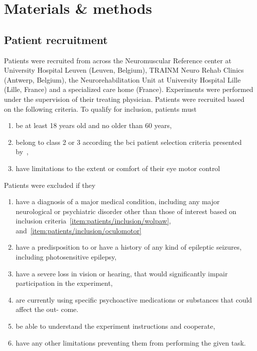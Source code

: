 \section{Materials \& methods}
\subsection{Patient recruitment}
Patients were recruited from across the Neuromuscular Reference center at
University Hospital Leuven (Leuven, Belgium), TRAINM Neuro Rehab Clinics
(Antwerp, Belgium), the Neurorehabilitation Unit at University Hospital Lille
(Lille, France) and a specialized care home (France).
Experiments were performed under the supervision of their treating physician.
Patients were recruited based on the following criteria.
To qualify for inclusion, patients must
\begin{enumerate}
	\item be at least 18 years old and no older than 60
	years,
  \item belong to class 2 or 3 according the \ac{bci}	patient selection criteria
    presented by~\textcite{Wolpaw2006},\label{item:patients/inclusion/wolpaw}
  \item have limitations to the extent or comfort of their eye motor control\label{item:patients/inclusion/oculomotor}
\end{enumerate}
Patients were excluded if they
\begin{enumerate}
  \item have a diagnosis of a major medical condition, including any major
    neurological or psychiatric disorder other than those of interest based on
    inclusion criteria~\ref{item:patients/inclusion/wolpaw},
    and~\ref{item:patients/inclusion/oculomotor}\label{item:patients/exclusion/medical}
  \item have a predisposition to or have a history of any kind of epileptic seizures,
    including photosensitive epilepsy,\label{item:patients/exclusion/epilepsy}
  \item have a severe loss in vision or hearing, that would significantly impair
        participation in the experiment,\label{item:patients/exclusion/vision}
  \item are currently using specific psychoactive medications or substances that could affect the out-
        come.\label{item:patients/exclusion/cognitive}
  \item be able to understand the experiment instructions and cooperate,
  \item have any other limitations preventing them from performing the given task.
\end{enumerate}

